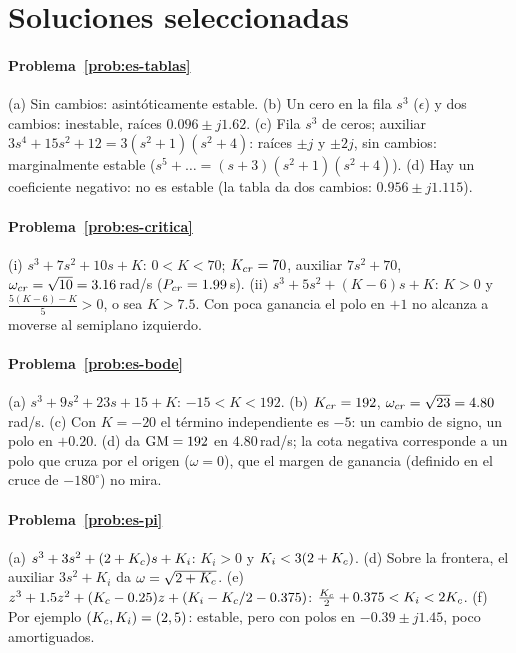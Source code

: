 \section{Soluciones seleccionadas}

\paragraph{Problema~\ref{prob:es-tablas}}
(a) Sin cambios: asintóticamente estable. (b) Un cero en la fila $s^3$ ($\epsilon$) y dos cambios: inestable, raíces $0.096\pm j1.62$. (c) Fila $s^3$ de ceros; auxiliar $3s^4+15s^2+12=3(s^2+1)(s^2+4)$: raíces $\pm j$ y $\pm2j$, sin cambios: marginalmente estable ($s^5+\dots=(s+3)(s^2+1)(s^2+4)$). (d) Hay un coeficiente negativo: no es estable (la tabla da dos cambios: $0.956\pm j1.115$).

\paragraph{Problema~\ref{prob:es-critica}}
(i) $s^3+7s^2+10s+K$: $0<K<70$; $K_{cr}=70$, auxiliar $7s^2+70$, $\omega_{cr}=\sqrt{10}=3.16$\,rad/s ($P_{cr}=1.99$\,s). (ii) $s^3+5s^2+(K-6)s+K$: $K>0$ y $\frac{5(K-6)-K}{5}>0$, o sea $K>7.5$. Con poca ganancia el polo en $+1$ no alcanza a moverse al semiplano izquierdo.

\paragraph{Problema~\ref{prob:es-bode}}
(a) $s^3+9s^2+23s+15+K$: $-15<K<192$. (b) $K_{cr}=192$, $\omega_{cr}=\sqrt{23}=4.80$\,rad/s. (c) Con $K=-20$ el término independiente es $-5$: un cambio de signo, un polo en $+0.20$. (d)  da $\mathrm{GM}=192$ en $4.80$\,rad/s; la cota negativa corresponde a un polo que cruza por el origen ($\omega=0$), que el margen de ganancia (definido en el cruce de $-180^\circ$) no mira.

\paragraph{Problema~\ref{prob:es-pi}}
(a) $s^3+3s^2+(2+K_c)s+K_i$: $K_i>0$ y $K_i<3(2+K_c)$. (d) Sobre la frontera, el auxiliar $3s^2+K_i$ da $\omega=\sqrt{2+K_c}$. (e) $z^3+1.5z^2+(K_c-0.25)z+(K_i-K_c/2-0.375)$: $\frac{K_c}{2}+0.375<K_i<2K_c$. (f) Por ejemplo $(K_c,K_i)=(2,5)$: estable, pero con polos en $-0.39\pm j1.45$, poco amortiguados.

